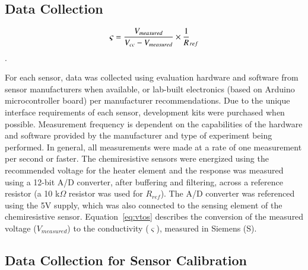 \documentclass[times]{joehreview}
\begin{document}
	
	\subsection*{Data Collection}
	\label{sec:method_datacollection}
	
	\begin{equation}
	\label{eq:vtos}
	\varsigma = \frac{V_{measured}}{V_{cc}-V_{measured}}\times \frac{1}R_{ref}\\
	\end{equation}.
	
	For each sensor, data was collected using evaluation hardware and software from sensor manufacturers when available, or lab-built electronics (based on Arduino microcontroller board) per manufacturer recommendations.  Due to the unique interface requirements of each sensor, development kits were purchased when possible.  Measurement frequency is dependent on the capabilities of the hardware and software provided by the manufacturer and type of experiment being performed.  In general, all measurements were made at a rate of one measurement per second or faster.  The chemiresistive sensors were energized using the recommended voltage for the heater element and the response was measured using a 12-bit A/D converter, after buffering and filtering, across a reference resistor (a 10 k$\Omega$ resistor was used for $R_{ref}$).  The A/D converter was referenced using the 5V supply, which was also connected to the sensing element of the chemiresistive sensor. Equation~\ref{eq:vtos} describes the conversion of the measured voltage ($V_{measured}$) to the conductivity ($\varsigma$), measured in Siemens (S).
	
	\subsection*{Data Collection for Sensor Calibration}
	\label{sec:method_cal}
	
\end{document}
